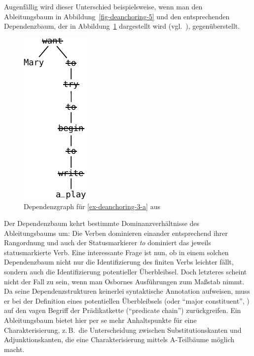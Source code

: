 Augenfällig wird dieser Unterschied beispielsweise, wenn man den Ableitungsbaum in Abbildung~\ref{fig-deanchoring-5} und den entsprechenden Dependenzbaum, der in Abbildung~\ref{fig-deanchroing-8} dargestellt wird (vgl.\ \citealt[(110)]{Osborne:08}), gegenüberstellt.
\begin{figure}[t]
\centering
\includegraphics{graphics/abb821.pdf}
\caption{\label{fig-deanchroing-8}Dependenzgraph für \ref{ex-deanchoring-3-a} aus \citet[(110)]{Osborne:08}}
\end{figure}
Der Dependenzbaum kehrt bestimmte Dominanzverhältnisse des Ableitungsbaums um: Die Verben dominieren einander entsprechend ihrer Rangordnung und auch der Statusmarkierer {\it to} dominiert das jeweils statusmarkierte Verb. Eine interessante Frage ist nun, ob in einem solchen Dependenzbaum nicht nur die Identifizierung des finiten Verbs leichter fällt, sondern auch die Identifizierung potentieller Überbleibsel. Doch letzteres scheint nicht der Fall zu sein, wenn man Osbornes Ausführungen zum Ma\ss stab nimmt. Da seine Dependenzstrukturen keinerlei syntaktische Annotation aufweisen, muss er bei der Definition eines potentiellen Überbleibsels (oder "`major constituent"', \citealt[1146]{Osborne:08}) auf den vagen Begriff der Prädikatkette ("`predicate chain"') zurückgreifen. Ein Ableitungsbaum bietet hier per se mehr Anhaltspunkte für eine Charakterisierung, z.\,B.\ die Unterscheidung zwischen Substitutionskanten und Adjunktionskanten, die eine Charakterisierung mittels A-Teilbäume möglich macht.

